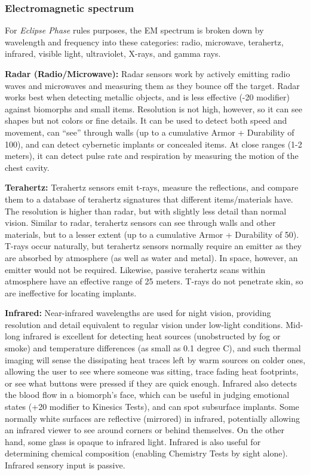 \subsubsection{Electromagnetic spectrum}

For \textit{Eclipse Phase} rules purposes, the EM spectrum is broken down by wavelength and frequency into these categories: radio, microwave, terahertz, infrared, visible light, ultraviolet, X-rays, and gamma rays.

\textbf{Radar (Radio/Microwave): }Radar sensors work by actively emitting radio waves and microwaves and measuring them as they bounce off the target. Radar works best when detecting metallic objects, and is less effective (-20 modifier) against biomorphs and small items. Resolution is not high, however, so it can see shapes but not colors or fine details. It can be used to detect both speed and movement, can ``see'' through walls (up to a cumulative Armor + Durability of 100), and can detect cybernetic implants or concealed items. At close ranges (1-2 meters), it can detect pulse rate and respiration by measuring the motion of the chest cavity.

\textbf{Terahertz:} Terahertz sensors emit t-rays, measure the reflections, and compare them to a database of terahertz signatures that different items/materials have. The resolution is higher than radar, but with slightly less detail than normal vision. Similar to radar, terahertz sensors can see through walls and other materials, but to a lesser extent (up to a cumulative Armor + Durability of 50). T-rays occur naturally, but terahertz sensors normally require an emitter as they are absorbed by atmosphere (as well as water and metal). In space, however, an emitter would not be required. Likewise, passive terahertz scans within atmosphere have an effective range of 25 meters. T-rays do not penetrate skin, so are ineffective for locating implants.

\textbf{Infrared:} Near-infrared wavelengths are used for night vision, providing resolution and detail equivalent to regular vision under low-light conditions. Mid-long infrared is excellent for detecting heat sources (unobstructed by fog or smoke) and temperature differences (as small as 0.1 degree C), and such thermal imaging will sense the dissipating heat traces left by warm sources on colder ones, allowing the user to see where someone was sitting, trace fading heat footprints, or see what buttons were pressed if they are quick enough. Infrared also detects the blood flow in a biomorph’s face, which can be useful in judging emotional states (+20 modifier to Kinesics Tests), and can spot subsurface implants. Some normally white surfaces are reflective (mirrored) in infrared, potentially allowing an infrared viewer to see around corners or behind themselves. On the other hand, some glass is opaque to infrared light. Infrared is also useful for determining chemical composition (enabling Chemistry Tests by sight alone). Infrared sensory input is passive.

